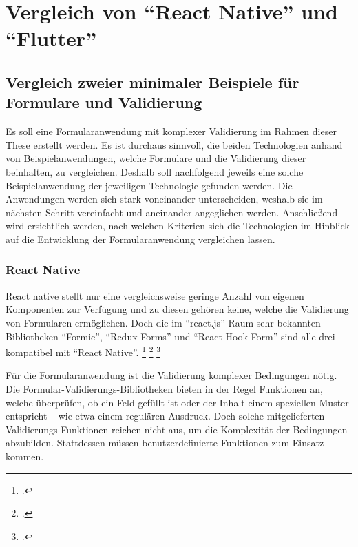 
\section{Vergleich von \enquote{React Native} und \enquote{Flutter}}
\label{sec:Vergleich-React-Native-und-Flutter}

\subsection{Vergleich zweier minimaler Beispiele für Formulare und Validierung} 


Es soll eine Formularanwendung mit komplexer Validierung im Rahmen dieser These erstellt werden.
Es ist durchaus sinnvoll, die beiden Technologien anhand von  Beispielanwendungen, welche Formulare und die Validierung dieser  beinhalten,   zu vergleichen.
Deshalb soll nachfolgend  jeweils eine solche Beispielanwendung der jeweiligen Technologie gefunden werden.
Die Anwendungen werden sich stark voneinander unterscheiden, weshalb sie im nächsten Schritt vereinfacht und aneinander angeglichen werden.
Anschließend wird ersichtlich werden, nach welchen Kriterien sich die Technologien im Hinblick auf die Entwicklung der Formularanwendung vergleichen lassen.

\subsubsection{React Native}

React native stellt nur eine vergleichsweise geringe Anzahl von eigenen Komponenten zur Verfügung und zu diesen gehören keine, welche die Validierung von Formularen ermöglichen.
Doch die im \enquote{react.js} Raum sehr bekannten Bibliotheken \enquote{Formic}, \enquote{Redux Forms} und \enquote{React Hook Form} sind alle drei kompatibel mit \enquote{React Native}.
\footcite[Vgl.][]{ReactNativeFormikDocs}
\footcite[Vgl.][]{DoesReduxFormWorkWithReactNative}
\footcite[Vgl.][]{ReactNativeReactHookFormGetStarted}


Für die Formularanwendung ist die Validierung komplexer Bedingungen nötig.
Die Formular-Validierungs-Bibliotheken bieten in der Regel Funktionen an, welche überprüfen, ob ein Feld gefüllt ist oder der Inhalt einem speziellen Muster entspricht -- wie etwa einem regulären Ausdruck.
Doch solche mitgelieferten Validierungs-Funktionen reichen nicht aus, um die Komplexität der Bedingungen abzubilden.
Stattdessen müssen benutzerdefinierte Funktionen zum Einsatz kommen.

